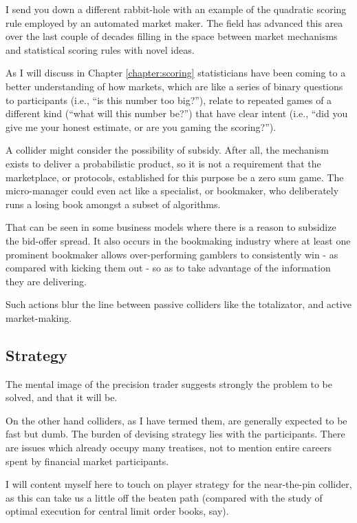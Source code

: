 I send you down a different rabbit-hole with an example of the quadratic scoring rule employed by an automated market maker. The field has advanced this area over the last couple of decades  filling in the space between market mechanisms and statistical scoring rules with novel ideas. 


As I will discuss in Chapter \ref{chapter:scoring} statisticians have been coming to a better understanding of how markets, which are like a series of binary questions to participants (i.e., ``is this number too big?''), relate to repeated games of a different kind (``what will this number be?'') that have clear intent (i.e., ``did you give me your honest estimate, or are you gaming the scoring?''). 

A collider might consider the possibility of subsidy. After all, the mechanism exists to deliver a probabilistic product, so it is not a requirement that the marketplace, or protocols, established for this purpose be a zero sum game. The micro-manager could even act like a specialist, or bookmaker, who deliberately runs a losing book amongst a subset of algorithms.  

That can be seen in some business models where there is a reason to subsidize the bid-offer spread. It also occurs in the bookmaking industry where at least one prominent bookmaker allows over-performing gamblers to consistently win - as compared with kicking them out - so as to take advantage of the information they are delivering. 

Such actions blur the line between passive colliders like the totalizator, and active market-making. 

\subsection{Strategy}

The mental image of the precision trader suggests strongly the problem to be solved, and that it will be.  

On the other hand colliders, as I have termed them, are generally expected to be fast but dumb. The burden of devising strategy lies with the participants. There are issues which already occupy many treatises, not to mention entire careers spent by financial market participants. 

I will content myself here to touch on player strategy for the near-the-pin collider, as this can take us a little off the beaten path (compared with the study of optimal execution for central limit order books, say). 

